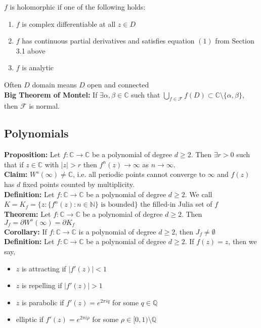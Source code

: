 \documentclass[12pt]{article}
\begin{document}
$f$ is holomorphic if one of the following holds:
\begin{enumerate}[label=(\alph*)]

\item $f$ is complex differentiable at all $z \in D$

\item $f$ has continuous partial derivatives and satisfies equation $(1)$ from Section 3.1 above

\item $f$ is analytic

\end{enumerate}

Often $D$ domain means $D$ open and connected\\

\textbf{Big Theorem of Montel:} If $\exists \alpha, \beta \in \mathbb{C}$ such that $\bigcup_{f \in \mathcal{F}} f(D) \subset \mathbb{C} \setminus \{\alpha, \beta\}$, then $\mathcal{F}$ is normal.

\subsection{Polynomials}

\textbf{Proposition:} Let $f: \mathbb{C} \to \mathbb{C}$ be a polynomial of degree $d \geq 2$. Then $\exists r > 0$ such that if $z \in \mathbb{C}$ with $|z| > r$ then $f^n(z) \to \infty$ as $n \to \infty$.\\

\textbf{Claim:} $W^s(\infty) \neq \mathbb{C}$, i.e. all periodic points cannot converge to $\infty$ and $f(z)$ has $d$ fixed points counted by multiplicity.\\

\textbf{Definition:} Let $f: \mathbb{C} \to \mathbb{C}$ be a polynomial of degree $d \geq 2$. We call $K = K_f = \{z: \{f^n(z): n \in \mathbb{N}\} \text{ is bounded}\}$ the filled-in Julia set of $f$\\

\textbf{Theorem:} Let $f: \mathbb{C} \to \mathbb{C}$ be a polynomial of degree $d \geq 2$. Then $J_f = \partial W^s(\infty) = \partial K_f$\\

\textbf{Corollary:} If $f: \mathbb{C} \to \mathbb{C}$ is a polynomial of degree $d \geq 2$, then $J_f \neq \emptyset$\\

\textbf{Definition:} Let $f: \mathbb{C} \to \mathbb{C}$ be a polynomial of degree $d \geq 2$. If $f(z) = z$, then we say,
\begin{itemize}
\item $z$ is attracting if $|f'(z)| < 1$

\item $z$ is repelling if $|f'(z)| > 1$

\item $z$ is parabolic if $f'(z) = e^{2 \pi i q}$ for some $q \in \mathbb{Q}$

\item elliptic if $f'(z) = e^{2 \pi i \rho}$ for some $\rho \in [0, 1) \setminus \mathbb{Q}$
\end{itemize}
\end{document}
